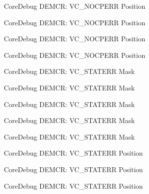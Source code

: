 \begin{DoxyRefList}
\label{deprecated__deprecated000209}%
%
Core\+Debug D\+E\+M\+CR\+: V\+C\+\_\+\+N\+O\+C\+P\+E\+RR Position 

\label{deprecated__deprecated000351}%
%
Core\+Debug D\+E\+M\+CR\+: V\+C\+\_\+\+N\+O\+C\+P\+E\+RR Position 

\label{deprecated__deprecated000427}%
%
Core\+Debug D\+E\+M\+CR\+: V\+C\+\_\+\+N\+O\+C\+P\+E\+RR Position 

\label{deprecated__deprecated000516}%
%
Core\+Debug D\+E\+M\+CR\+: V\+C\+\_\+\+N\+O\+C\+P\+E\+RR Position  
\item[Member \mbox{\hyperlink{group__CMSIS__CoreDebug_gaa38b947d77672c48bba1280c0a642e19}{Core\+Debug\+\_\+\+D\+E\+M\+C\+R\+\_\+\+V\+C\+\_\+\+S\+T\+A\+T\+E\+R\+R\+\_\+\+Msk}} ]\label{deprecated__deprecated000062}%
%
Core\+Debug D\+E\+M\+CR\+: V\+C\+\_\+\+S\+T\+A\+T\+E\+RR Mask 

\label{deprecated__deprecated000206}%
%
Core\+Debug D\+E\+M\+CR\+: V\+C\+\_\+\+S\+T\+A\+T\+E\+RR Mask 

\label{deprecated__deprecated000348}%
%
Core\+Debug D\+E\+M\+CR\+: V\+C\+\_\+\+S\+T\+A\+T\+E\+RR Mask 

\label{deprecated__deprecated000424}%
%
Core\+Debug D\+E\+M\+CR\+: V\+C\+\_\+\+S\+T\+A\+T\+E\+RR Mask 

\label{deprecated__deprecated000513}%
%
Core\+Debug D\+E\+M\+CR\+: V\+C\+\_\+\+S\+T\+A\+T\+E\+RR Mask  
\item[Member \mbox{\hyperlink{group__CMSIS__CoreDebug_ga16f0d3d2ce1e1e8cd762d938ac56c4ac}{Core\+Debug\+\_\+\+D\+E\+M\+C\+R\+\_\+\+V\+C\+\_\+\+S\+T\+A\+T\+E\+R\+R\+\_\+\+Pos}} ]\label{deprecated__deprecated000061}%
%
Core\+Debug D\+E\+M\+CR\+: V\+C\+\_\+\+S\+T\+A\+T\+E\+RR Position 

\label{deprecated__deprecated000205}%
%
Core\+Debug D\+E\+M\+CR\+: V\+C\+\_\+\+S\+T\+A\+T\+E\+RR Position 

\label{deprecated__deprecated000347}%
%
Core\+Debug D\+E\+M\+CR\+: V\+C\+\_\+\+S\+T\+A\+T\+E\+RR Position 


\end{DoxyRefList}
